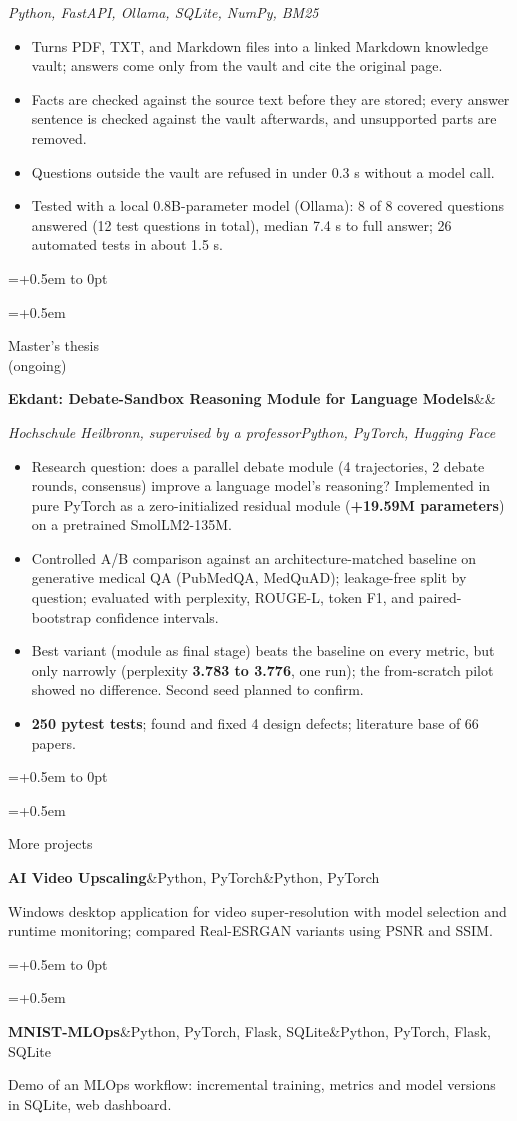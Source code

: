\documentclass[10pt,a4paper]{article}
\newlength{\leftcol}\setlength{\leftcol}{2.45cm}
\newcommand{\gap}{0.5em}
\newcommand{\sep}{\hspace{0.45em}\textbar\hspace{0.45em}}
\newcommand{\entry}[3]{%
  \begingroup\raggedright\leftskip=\dimexpr\leftcol+\gap\relax\noindent
  \hspace*{-\dimexpr\leftcol+\gap\relax}%
  \vtop to 0pt{\hsize=\dimexpr\leftcol+\gap\relax\raggedright\small\color{mid}\noindent #1\par\vss}%
  #2\par #3\par\endgroup\vspace{4pt}}
\newcommand{\etitle}[2]{\textbf{#1}\ifx&#2&\else\textcolor{mid}{\sep}#2\fi}
\newcommand{\stack}[1]{{\small\itshape\color{mid}#1}\par\vspace{1pt}}
\begin{document}
  {\stack{Python, FastAPI, Ollama, SQLite, NumPy, BM25}
  \begin{itemize}
    \item Turns PDF, TXT, and Markdown files into a linked Markdown knowledge vault; answers come only from the vault and cite the original page.
    \item Facts are checked against the source text before they are stored; every answer sentence is checked against the vault afterwards, and unsupported parts are removed.
    \item Questions outside the vault are refused in under 0.3 s without a model call.
    \item Tested with a local 0.8B-parameter model (Ollama): 8 of 8 covered questions answered (12 test questions in total), median 7.4 s to full answer; 26 automated tests in about 1.5 s.
  \end{itemize}}
\newpage
\entry{Master's thesis\\(ongoing)}
  {\etitle{Ekdant: Debate-Sandbox Reasoning Module for Language Models}{}}
  {\stack{Hochschule Heilbronn, supervised by a professor\sep Python, PyTorch, Hugging Face}
  \begin{itemize}
    \item Research question: does a parallel debate module (4 trajectories, 2 debate rounds, consensus) improve a language model's reasoning? Implemented in pure PyTorch as a zero-initialized residual module (\textbf{+19.59M parameters}) on a pretrained SmolLM2-135M.
    \item Controlled A/B comparison against an architecture-matched baseline on generative medical QA (PubMedQA, MedQuAD); leakage-free split by question; evaluated with perplexity, ROUGE-L, token F1, and paired-bootstrap confidence intervals.
    \item Best variant (module as final stage) beats the baseline on every metric, but only narrowly (perplexity \textbf{3.783 to 3.776}, one run); the from-scratch pilot showed no difference. Second seed planned to confirm.
    \item \textbf{250 pytest tests}; found and fixed 4 design defects; literature base of 66 papers.
  \end{itemize}}
\entry{More projects}
  {\etitle{AI Video Upscaling}{Python, PyTorch}}
  {\small Windows desktop application for video super-resolution with model selection and runtime monitoring; compared Real-ESRGAN variants using PSNR and SSIM.}
\entry{\strut}
  {\etitle{MNIST-MLOps}{Python, PyTorch, Flask, SQLite}}
  {\small Demo of an MLOps workflow: incremental training, metrics and model versions in SQLite, web dashboard.}
\end{document}
